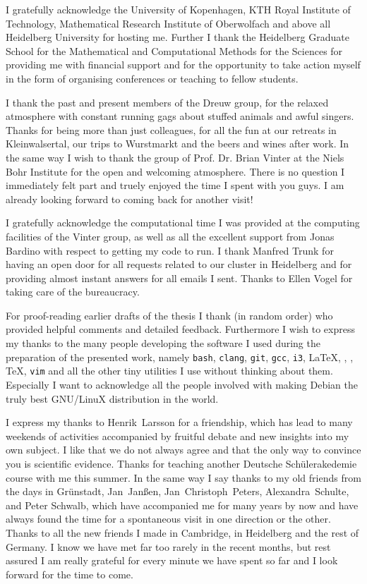 
I gratefully acknowledge
the University of Kopenhagen,
KTH Royal Institute of Technology,
Mathematical Research Institute of Oberwolfach
and above all Heidelberg University for hosting me.
Further I thank the Heidelberg Graduate School
for the Mathematical and Computational Methods for the Sciences
for providing me with financial support
and for the opportunity to take action myself
in the form of organising conferences or teaching to fellow students.

I thank the past and present members of the Dreuw group,
for the relaxed atmosphere
with constant running gags about
stuffed animals and awful singers.
Thanks for being more than just colleagues,
for all the fun
at our retreats in Kleinwalsertal, our trips to Wurstmarkt and
the beers and wines after work.
In the same way I wish to thank
the group of Prof. Dr. Brian Vinter at the Niels Bohr Institute
for the open and welcoming atmosphere.
There is no question I immediately felt part
and truely enjoyed the time I spent with you guys.
I am already looking forward to coming back for another visit!

I gratefully acknowledge the computational time I was provided
at the computing facilities of the Vinter group,
as well as all the excellent support from Jonas Bardino
with respect to getting my code to run.
I thank Manfred Trunk
for having an open door for all requests related
to our cluster in Heidelberg
and for providing almost instant answers for all emails I sent.
Thanks to Ellen Vogel for taking care of the bureaucracy.


For proof-reading earlier drafts of the thesis I thank
(in random order)
%
who provided helpful comments and detailed feedback.
Furthermore I wish to express my thanks to the many people developing
the software I used during the preparation of the presented work,
namely
\texttt{bash},
\texttt{clang},
\texttt{git},
\texttt{gcc},
\texttt{i3},
\LaTeX,
\numpy,
\python,
\TeX,
\texttt{vim}
and all the other tiny utilities I use without thinking about them.
Especially I want to acknowledge all the people
involved with making Debian the truly best
GNU/LinuX distribution in the world.


I express my thanks to Henrik~Larsson for a friendship,
which has lead to many weekends of activities accompanied
by fruitful debate and new insights into my own subject.
I like that we do not always agree
and that the only way to convince you is scientific evidence.
Thanks for teaching another Deutsche Schülerakedemie course with me this summer.
In the same way I say thanks to my old friends
from the days in Grünstadt,
Jan~Janßen,
Jan~Christoph~Peters,
Alexandra~Schulte,
and
Peter Schwalb,
which have accompanied me for many years by now
and have always found the time for a spontaneous visit
in one direction or the other.
Thanks to all the new friends I made in Cambridge,
in Heidelberg and the rest of Germany.
I know we have met far too rarely in the recent months,
but rest assured I am really
grateful for every minute we have spent so far
and I look forward for the time to come.

